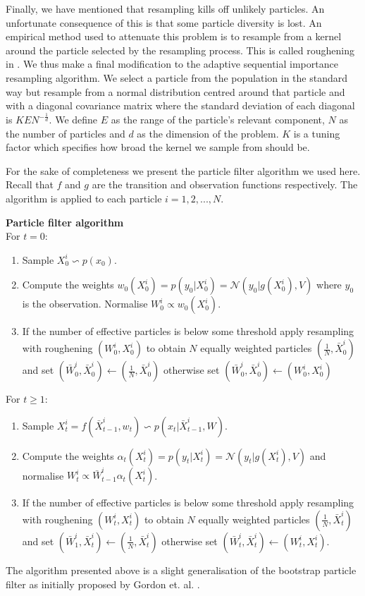 Finally, we have mentioned that resampling kills off unlikely particles. An unfortunate consequence of this is that some particle diversity is lost. An empirical method used to attenuate this problem is to resample from a kernel around the particle selected by the resampling process. This is called roughening in \cite{gordon}. We thus make a final modification to the adaptive sequential importance resampling algorithm. We select a particle from the population in the standard way but resample from a normal distribution centred around that particle and with a diagonal covariance matrix where the standard deviation of each diagonal is $KEN^{-\frac{1}{d}}$. We define $E$ as the range of the particle's relevant component, $N$ as the number of particles and $d$ as the dimension of the problem. $K$ is a tuning factor which specifies how broad the kernel we sample from should be. 

For the sake of completeness we present the particle filter algorithm we used here. Recall that $f$ and $g$ are the transition and observation functions respectively. The algorithm is applied to each particle $i=1,2,...,N$.

\textbf{Particle filter algorithm}\\
For $t=0$:
\begin{enumerate}
\item
Sample $X^i_0 \backsim p(x_0)$.
\item
Compute the weights $w_0(X_0^i) = p(y_0|X_0^i) = \mathcal{N}(y_0|g(X^i_0), V)$ where $y_0$ is the observation. Normalise $W^i_0 \propto w_0(X^i_0)$.
\item
If the number of effective particles is below some threshold apply resampling with roughening $(W^i_0, X^i_0)$ to obtain $N$ equally weighted particles $(\frac{1}{N}, \bar{X}^i_0)$ and set $(\bar{W}^i_0, \bar{X}^i_0) \leftarrow (\frac{1}{N}, \bar{X}^i_0)$ otherwise set $(\bar{W}^i_0, \bar{X}^i_0) \leftarrow ({W}^i_0, {X}^i_0)$
\end{enumerate}
For $t \geq 1$:
\begin{enumerate}
\item
Sample $X^i_t = f(\bar{X}^i_{t-1}, w_t) \backsim p(x_t|\bar{X}^i_{t-1}, W)$.
\item
Compute the weights $\alpha_t(X^i_{t}) = p(y_t|X_t^i) = \mathcal{N}(y_t|g(X^i_t), V)$ and normalise $W^i_t \propto \bar{W}^i_{t-1}\alpha_t(X^i_{t})$.
\item
If the number of effective particles is below some threshold apply resampling with roughening $(W^i_t, X^i_{t})$ to obtain $N$ equally weighted particles $(\frac{1}{N}, \bar{X}^i_{t})$ and set $(\bar{W}^i_1, \bar{X}^i_t) \leftarrow (\frac{1}{N}, \bar{X}^i_t)$ otherwise set $(\bar{W}^i_t, \bar{X}^i_t) \leftarrow ({W}^i_t, {X}^i_t)$.
\end{enumerate}
The algorithm presented above is a slight generalisation of the bootstrap particle filter as initially proposed by Gordon et. al. \cite{gordon}.

